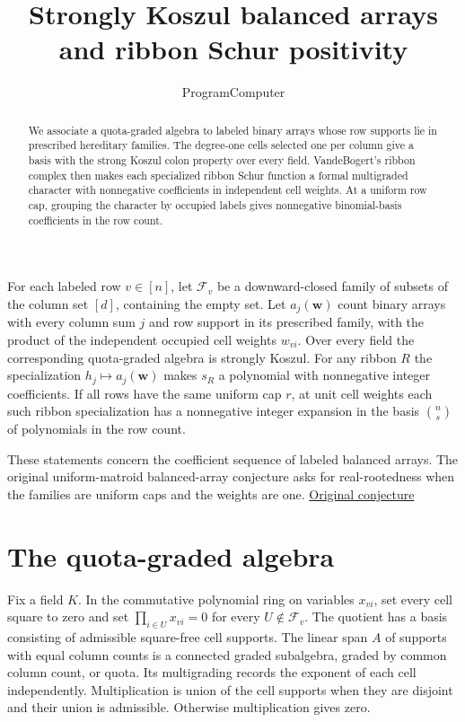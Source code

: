 \documentclass[11pt]{article}
\title{Strongly Koszul balanced arrays and ribbon Schur positivity}
\author{ProgramComputer}
\date{}
\begin{document}
\maketitle

\begin{abstract}
We associate a quota-graded algebra to labeled binary arrays whose row
supports lie in prescribed hereditary families. The degree-one cells
selected one per column give a basis with the strong Koszul colon
property over every field. VandeBogert's ribbon complex then makes each
specialized ribbon Schur function a formal multigraded character with nonnegative coefficients
in independent cell weights. At a uniform row cap, grouping the character
by occupied labels gives nonnegative binomial-basis coefficients in the
row count.
\end{abstract}

For each labeled row $v\in[n]$, let $\mathcal F_v$ be a downward-closed family of subsets of the column set $[d]$, containing the empty set. Let $a_j(\mathbf w)$ count binary arrays with every column sum $j$ and row support in its prescribed family, with the product of the independent occupied cell weights $w_{vi}$. Over every field the corresponding quota-graded algebra is strongly Koszul. For any ribbon $R$ the specialization $h_j\mapsto a_j(\mathbf w)$ makes $s_R$ a polynomial with nonnegative integer coefficients. If all rows have the same uniform cap $r$, at unit cell weights each such ribbon specialization has a nonnegative integer expansion in the basis $\binom ns$ of polynomials in the row count.

These statements concern the coefficient sequence of labeled balanced arrays. The original uniform-matroid balanced-array conjecture asks for real-rootedness when the families are uniform caps and the weights are one. \href{https://www.symmetricfunctions.com/realRootedOpenProblems.htm#conjBalancedArrays}{Original conjecture}

\section{The quota-graded algebra}

Fix a field $K$. In the commutative polynomial ring on variables $x_{vi}$, set every cell square to zero and set $\prod_{i\in U}x_{vi}=0$ for every $U\notin\mathcal F_v$. The quotient has a basis consisting of admissible square-free cell supports. The linear span $A$ of supports with equal column counts is a connected graded subalgebra, graded by common column count, or quota. Its multigrading records the exponent of each cell independently. Multiplication is union of the cell supports when they are disjoint and their union is admissible. Otherwise multiplication gives zero.
\end{document}
